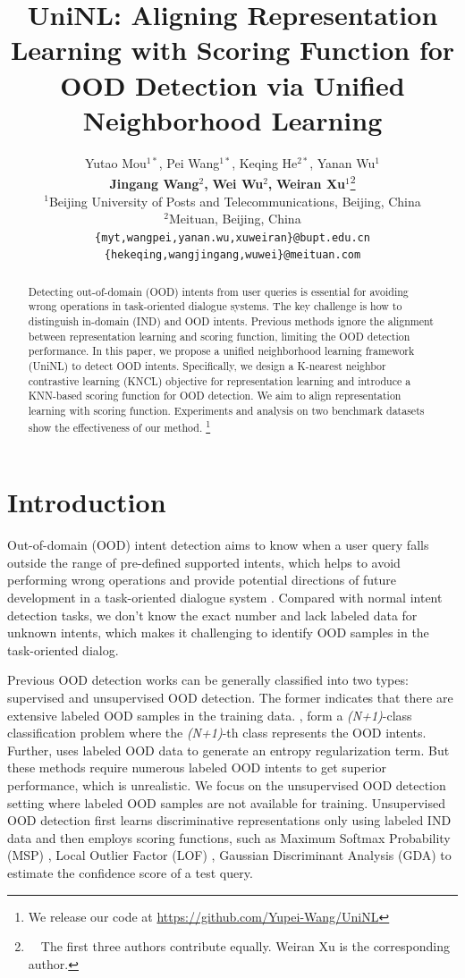 \documentclass[11pt]{article}
\title{UniNL: Aligning Representation Learning with Scoring Function for OOD Detection via Unified Neighborhood Learning}
\author{Yutao Mou$^{1*}$, Pei Wang$^{1*}$, Keqing He$^{2*}$, Yanan Wu$^{1}$ \\
{\bf Jingang Wang$^{2}$,} {\bf Wei Wu$^{2}$,} {\bf Weiran Xu$^{1}$}\thanks{\ \ The first three authors contribute equally. Weiran Xu is the corresponding author.}\\
  $^1$Beijing University of Posts and Telecommunications, Beijing, China\\
$^{2}$Meituan, Beijing, China\\
  \texttt{\{myt,wangpei,yanan.wu,xuweiran\}@bupt.edu.cn}\\
  \texttt{\{hekeqing,wangjingang,wuwei\}@meituan.com}
}
\begin{document}
\maketitle
\begin{abstract}
Detecting out-of-domain (OOD) intents from user queries is essential for avoiding wrong operations in task-oriented dialogue systems. The key challenge is how to distinguish in-domain (IND) and OOD intents. Previous methods ignore the alignment between representation learning and scoring function, limiting the OOD detection performance. In this paper, we propose a unified neighborhood learning framework (UniNL) to detect OOD intents. Specifically, we design a K-nearest neighbor contrastive learning (KNCL) objective for representation learning and introduce a KNN-based scoring function for OOD detection. We aim to align representation learning with scoring function. Experiments and analysis on two benchmark datasets show the effectiveness of our method. \footnote{We release our code at \url{https://github.com/Yupei-Wang/UniNL}}

\end{abstract}

\section{Introduction}

Out-of-domain (OOD) intent detection aims to know when a user query falls outside the range of pre-defined supported intents, which helps to avoid performing wrong operations and provide potential directions of future development in a task-oriented dialogue system \cite{Akasaki2017ChatDI,Tulshan2018SurveyOV,Shum2018FromET,Lin2019DeepUI,xu-etal-2020-deep,zeng-etal-2021-modeling,zeng-etal-2021-adversarial}. Compared with normal intent detection tasks, we don't know the exact number and lack labeled data for unknown intents, which makes it challenging to identify OOD samples in the task-oriented dialog.

Previous OOD detection works can be generally classified into two types: supervised \cite{Fei2016BreakingTC,Kim2018JointLO,Larson2019AnED,Zheng2020OutofDomainDF} and unsupervised \cite{Bendale2016TowardsOS,Hendrycks2017ABF,Shu2017DOCDO,Lee2018ASU,Ren2019LikelihoodRF,Lin2019DeepUI,xu-etal-2020-deep,zeng-etal-2021-modeling} OOD detection. The former indicates that there are extensive labeled OOD samples in the training data. , form a \emph{(N+1)}-class classification problem where the \emph{(N+1)}-th class represents the OOD intents. Further,  uses labeled OOD data to generate an entropy regularization term. But these methods require numerous labeled OOD intents to get superior performance, which is unrealistic. We focus on the unsupervised OOD detection setting where labeled OOD samples are not available for training. Unsupervised OOD detection first learns discriminative representations only using labeled IND data and then employs scoring functions, such as Maximum Softmax Probability (MSP) \cite{Hendrycks2017ABF}, Local Outlier Factor (LOF) \cite{Lin2019DeepUI}, Gaussian Discriminant Analysis (GDA) \cite{xu-etal-2020-deep} to estimate the confidence score of a test query. 
\end{document}

